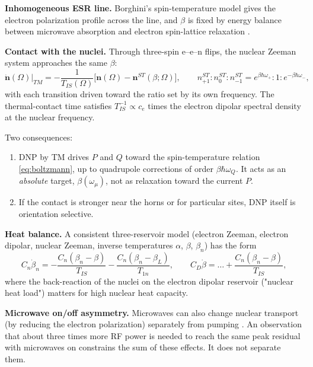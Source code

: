 \documentclass[11pt]{article}
\begin{document}
\textbf{Inhomogeneous ESR line.} Borghini's spin-temperature model gives the electron
polarization profile across the line, and $\beta$ is fixed by energy balance between
microwave absorption and electron spin-lattice relaxation \cite{Borghini1968,AbragamGoldman1978}.

\textbf{Contact with the nuclei.} Through three-spin e--e--n flips, the nuclear Zeeman system
approaches the same $\beta$:
\begin{equation}
\dot{\bm n}(\Omega)\big|_{TM}=-\frac{1}{T_{IS}(\Omega)}\Big[\bm n(\Omega)-\bm n^{ST}(\beta;\Omega)\Big],\qquad
n^{ST}_{+1}:n^{ST}_0:n^{ST}_{-1}=e^{\beta\hbar\omega_+}:1:e^{-\beta\hbar\omega_-},
\label{eq:tmcontact}
\end{equation}
with each transition driven toward the ratio set by its own frequency. The thermal-contact time
satisfies $T_{IS}^{-1}\propto c_e$ times the electron dipolar spectral density at the nuclear
frequency.

Two consequences:
\begin{enumerate}
\item DNP by TM drives $P$ and $Q$ toward the spin-temperature relation \eqref{eq:boltzmann},
up to quadrupole corrections of order $\beta\hbar\omega_Q$. It acts as an \emph{absolute}
target, $\beta(\omega_\mu)$, not as relaxation toward the current $P$.
\item If the contact is stronger near the horns or for particular sites, DNP itself is
orientation selective.
\end{enumerate}

\textbf{Heat balance.} A consistent three-reservoir model (electron Zeeman, electron dipolar,
nuclear Zeeman, inverse temperatures $\alpha$, $\beta$, $\beta_n$) has the form
\begin{equation}
C_n\dot\beta_n=-\frac{C_n(\beta_n-\beta)}{T_{IS}}-\frac{C_n(\beta_n-\beta_L)}{T_{1n}},\qquad
C_D\dot\beta=\dots+\frac{C_n(\beta_n-\beta)}{T_{IS}},
\end{equation}
where the back-reaction of the nuclei on the electron dipolar reservoir ("nuclear heat load")
matters for high nuclear heat capacity.

\textbf{Microwave on/off asymmetry.} Microwaves can also change nuclear transport (by reducing
the electron polarization) separately from pumping \cite{Chessari2023}. An observation that
about three times more RF power is needed to reach the same peak residual with microwaves on
constrains the sum of these effects. It does not separate them.
\end{document}
